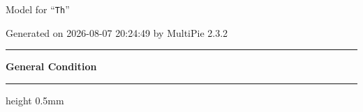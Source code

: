 \documentclass[fleqn,10pt,landscape]{jsarticle}
\begin{document}
\setcounter{MaxMatrixCols}{32}

\renewcommand{\tablename}{Table~}
\renewcommand{\figurename}{Figure~}
\setlength{\baselineskip}{16pt}
\setlength{\parindent}{0pt}
\setlength{\mathindent}{0pt}
\footnotesize
\begin{center}
\LARGE
Model for ``\texttt{Th}''
\end{center}
\begin{flushright}
Generated on 2026-08-07 20:24:49 by MultiPie 2.3.2
\end{flushright}
\setlength{\baselineskip}{16pt}
\footnotesize
\vspace{5mm}
\noindent \rule[0.5mm]{5mm}{0.5mm}\hspace{3mm}\textbf{General Condition}\hspace{3mm}\leaders\hrule height 0.5mm\hfill\kern0pt
\vspace{3mm}
\end{document}
